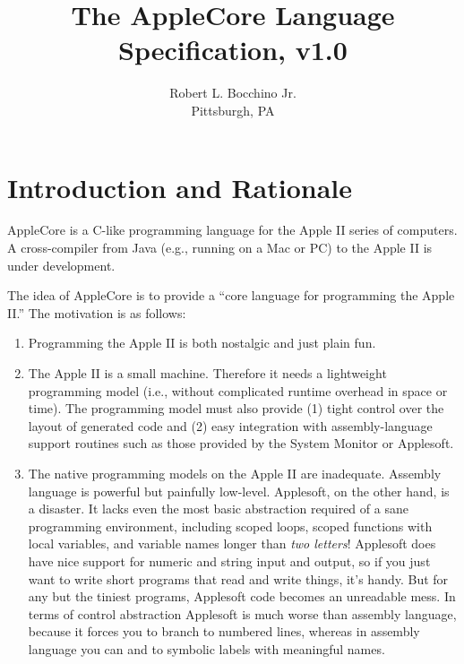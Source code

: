 \documentclass[10pt]{article}
\title{\bfseries{The AppleCore Language Specification, v1.0}}
\author{Robert L. Bocchino Jr.\\
Pittsburgh, PA}
\begin{document}
\maketitle

\tableofcontents

\section{Introduction and Rationale}

AppleCore is a C-like programming language for the Apple II series of
computers.  A cross-compiler from Java (e.g., running on a Mac or PC)
to the Apple II is under development.

The idea of AppleCore is to provide a ``core language for programming
the Apple II.''  The motivation is as follows:
%
\begin{enumerate}
%
\item Programming the Apple II is both nostalgic and just plain fun.
%
\item The Apple II is a small machine.  Therefore it needs a
  lightweight programming model (i.e., without complicated runtime
  overhead in space or time).  The programming model must also provide
  (1) tight control over the layout of generated code and (2) easy
  integration with assembly-language support routines such as those
  provided by the System Monitor or Applesoft.
%
\item The native programming models on the Apple II are inadequate.
  Assembly language is powerful but painfully low-level.  Applesoft,
  on the other hand, is a disaster.  It lacks even the most basic
  abstraction required of a sane programming environment, including
  scoped loops, scoped functions with local variables, and variable
  names longer than \emph{two letters}!  Applesoft does have nice
  support for numeric and string input and output, so if you just want
  to write short programs that read and write things, it's handy. But
  for any but the tiniest programs, Applesoft code becomes an
  unreadable mess.  In terms of control abstraction Applesoft is much
  worse than assembly language, because it forces you to branch to
  numbered lines, whereas in assembly language you can  and
   to symbolic labels with meaningful names.
%
\end{enumerate}
\end{document}
